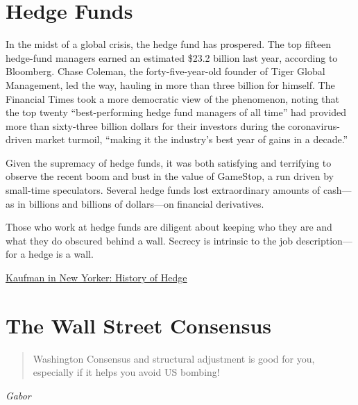 \documentclass[
]{book}
\begin{document}
\hypertarget{hedge-funds}{%
\section{Hedge Funds}\label{hedge-funds}}

In the midst of a global crisis, the hedge fund has prospered. The top fifteen hedge-fund managers earned an estimated \$23.2 billion last year, according to Bloomberg. Chase Coleman, the forty-five-year-old founder of Tiger Global Management, led the way, hauling in more than three billion for himself. The Financial Times took a more democratic view of the phenomenon, noting that the top twenty ``best-performing hedge fund managers of all time'' had provided more than sixty-three billion dollars for their investors during the coronavirus-driven market turmoil, ``making it the industry's best year of gains in a decade.''

Given the supremacy of hedge funds, it was both satisfying and terrifying to observe the recent boom and bust in the value of GameStop, a run driven by small-time speculators. Several hedge funds lost extraordinary amounts of cash---as in billions and billions of dollars---on financial derivatives.

Those who work at hedge funds are diligent about keeping who they are and what they do obscured behind a wall. Secrecy is intrinsic to the job description---for a hedge is a wall.

\href{https://www.newyorker.com/culture/culture-desk/a-brief-history-of-the-hedge-fund}{Kaufman in New Yorker: History of Hedge}

\hypertarget{the-wall-street-consensus}{%
\section{The Wall Street Consensus}\label{the-wall-street-consensus}}

\begin{quote}
Washington Consensus and structural adjustment is good for you,
especially if it helps you avoid US bombing!
\end{quote}

\emph{Gabor}
\end{document}
